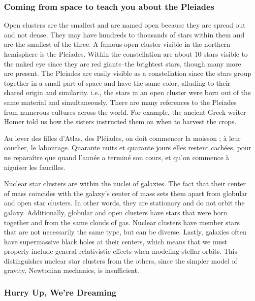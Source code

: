 \subsubsection*{Coming from space to teach you about the Pleiades }

Open clusters are the smallest and are named open because they are spread out and not dense. They may have hundreds to thousands of stars within them and are the smallest of the three. A famous open cluster visible in the northern hemisphere is the Pleiades. Within the constellation are about 10 stars visible to the naked eye since they are red giants–the brightest stars, though many more are present. The Pleiades are easily visible as a constellation since the stars group together in a small part of space and have the same color, alluding to their shared origin and similarity. i.e., the stars in an open cluster were born out of the same material and simultaneously. There are many references to the Pleiades from numerous cultures across the world. For example, the ancient Greek writer Homer told us how the sisters instructed them on when to harvest the crops. 

Au lever des filles d'Atlas, des Pléiades, on doit commencer la moisson ; à leur coucher, le labourage. Quarante nuits et quarante jours elles restent cachées, pour ne reparaître que quand l'année a terminé son cours, et qu'on commence à aiguiser les faucilles.

Nuclear star clusters are within the nuclei of galaxies. The fact that their center of mass coincides with the galaxy's center of mass sets them apart from globular and open star clusters. In other words, they are stationary and do not orbit the galaxy. Additionally, globular and open clusters have stars that were born together and from the same clouds of gas. Nuclear clusters have member stars that are not necessarily the same type, but can be diverse. Lastly, galaxies often have supermassive black holes at their centers, which means that we must properly include general relativistic effects when modeling stellar orbits. This distinguishes nuclear star clusters from the others, since the simpler model of gravity, Newtonian mechanics, is insufficient.

\subsubsection*{Hurry Up, We're Dreaming}


